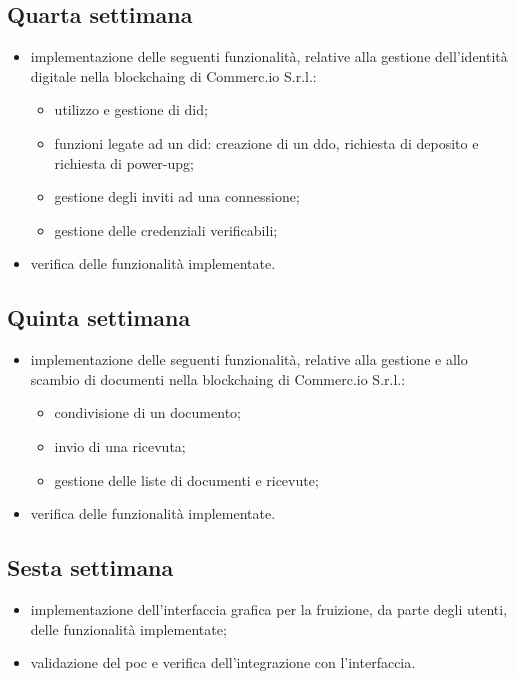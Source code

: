 \subsection*{Quarta settimana} 
\begin{itemize}
	\item implementazione delle seguenti funzionalità, relative alla gestione dell'identità digitale nella \gls{blockchaing} di Commerc.io S.r.l.:
	\begin{itemize}
		\item utilizzo e gestione di \gls{did}\glsfirstoccur;
		\item funzioni legate ad un \gls{did}: creazione di un \gls{ddo}\glsfirstoccur, richiesta di deposito e richiesta di \gls{power-upg}\glsfirstoccur;
		\item gestione degli inviti ad una connessione;
		\item gestione delle credenziali verificabili;
	\end{itemize}
	\item verifica delle funzionalità implementate.
\end{itemize}

\subsection*{Quinta settimana} 
\begin{itemize}
	\item implementazione delle seguenti funzionalità, relative alla gestione e allo scambio di documenti nella \gls{blockchaing} di Commerc.io S.r.l.:
	\begin{itemize}
		\item condivisione di un documento;
		\item invio di una ricevuta;
		\item gestione delle liste di documenti e ricevute;
	\end{itemize}
	\item verifica delle funzionalità implementate.
\end{itemize}

\subsection*{Sesta settimana} 
\begin{itemize}
	\item implementazione dell'interfaccia grafica per la fruizione, da parte degli utenti, delle funzionalità implementate;
	\item validazione del \gls{poc} e verifica dell'integrazione con l'interfaccia.
\end{itemize}

